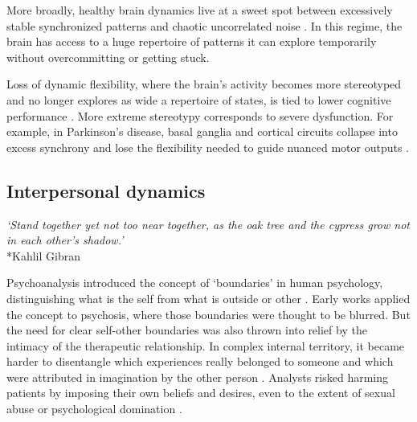 \documentclass[12pt]{article}
\begin{document}
More broadly, healthy brain dynamics live at a sweet spot between excessively stable synchronized patterns and chaotic uncorrelated noise \citep{beggs2003neuronal, chialvo2010emergent, tognoli2014metastable, deco2011emerging, bak1987self, shew2011information, rabinovich2008transient, haldeman2005critical, kotler2025pathfinding}. In this regime, the brain has access to a huge repertoire of patterns it can explore temporarily without overcommitting or getting stuck. 

Loss of dynamic flexibility, where the brain's activity becomes more stereotyped and no longer explores as wide a repertoire of states, is tied to lower cognitive performance \citep{garrett2013bold, grady2014understanding, cocchi2017criticality, muller2025critical, shew2009neuronal}. More extreme stereotypy corresponds to severe dysfunction. For example, in Parkinson's disease, basal ganglia and cortical circuits collapse into excess synchrony and lose the flexibility needed to guide nuanced motor outputs \citep{hammond2007pathological, brown2003rhythmic}. 


\subsection{Interpersonal dynamics}

\begin{center}
\textit{`Stand together yet not too near together, as the oak tree and the cypress grow not in each other's shadow.'}\\*Kahlil Gibran
\end{center}


Psychoanalysis introduced the concept of `boundaries' in human psychology, distinguishing what is the self from what is outside or other \citep{federn1928narcissism, tausk1919entstehung}. Early works applied the concept to psychosis, where those boundaries were thought to be blurred. But the need for clear self-other boundaries was also thrown into relief by the intimacy of the therapeutic relationship. In complex internal territory, it became harder to disentangle which experiences really belonged to someone and which were attributed in imagination by the other person \citep{freud1894neuro, freud1910future}. Analysts risked harming patients by imposing their own beliefs and desires, even to the extent of sexual abuse or psychological domination \citep{gabbard1995boundaries}. 
\end{document}
